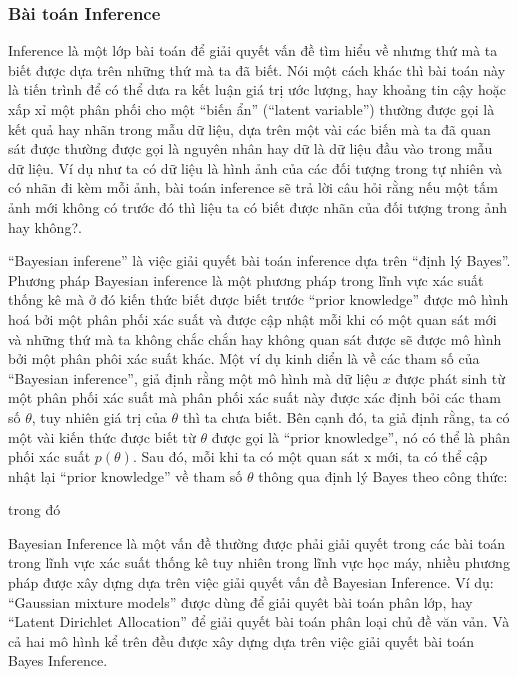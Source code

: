         \subsubsection{Bài toán Inference}
        Inference là một lớp bài toán để giải quyết vấn đề tìm hiểu về nhưng thứ mà ta biết được dựa trên những thứ mà ta đã biết. 
        Nói một cách khác thì bài toán này là tiến trình để có thể dưa ra kết luận giá trị ước lượng, hay khoảng tin cậy hoặc xấp xỉ một phân phối cho một ``biến ẩn'' (``latent variable'') thường được gọi là kết quả hay nhãn trong mẫu dữ liệu, dựa trên một vài các biến mà ta đã quan sát được thường được gọi là nguyên nhân hay dữ là dữ liệu đầu vào trong mẫu dữ liệu. 
        Ví dụ như ta có dữ liệu là hình ảnh của các đối tượng trong tự nhiên và có nhãn đi kèm mỗi ảnh, bài toán inference sẽ trả lời câu hỏi rằng nếu một tấm ảnh mới không có trước đó thì liệu ta có biết được nhãn của đối tượng trong ảnh hay không?. 

        ``Bayesian inferene'' là việc giải quyết bài toán inference dựa trên ``định lý Bayes''. Phương pháp Bayesian inference là một phương pháp trong lĩnh vực xác suất thống kê mà ở đó kiến thức biết được biết trước ``prior knowledge'' được mô hình hoá bởi một phân phối xác suất và được cập nhật mỗi khi có một quan sát mới và những thứ mà ta không chắc chắn hay không quan sát được sẽ được mô hình bởi một phân phôi xác suất khác. Một ví dụ kinh diển là về các tham số của ``Bayesian inference'', giả định rằng một mô hình mà dữ liệu $x$ được phát sinh từ một phân phối xác suất mà phân phối xác suất này được xác định bỏi các tham số $\theta$, tuy nhiên giá trị của $\theta$ thì ta chưa biết. Bên cạnh đó, ta giả định rằng, ta có một vài kiến thức được biết từ $\theta$ được gọi là ``prior knowledge'', nó có thể là phân phối xác suất $p(\theta)$. Sau đó, mỗi khi ta có một quan sát x mới, ta có thể cập nhật lại ``prior knowledge'' về tham số $\theta$ thông qua định lý Bayes theo công thức:

        trong đó 

        
        Bayesian Inference là một vấn đề thường được phải giải quyết trong các bài toán trong lĩnh vực xác suất thống kê tuy nhiên trong lĩnh vực học máy, nhiều phương pháp được xây dựng dựa trên việc giải quyết vấn đề Bayesian Inference. Ví dụ: ``Gaussian mixture models'' được dùng để giải quyêt bài toán phân lớp, hay ``Latent Dirichlet Allocation'' để giải quyết bài toán phân loại chủ đề văn vản. Và cả hai mô hình kể trên đều được xây dựng dựa trên việc giải quyết bài toán Bayes Inference.  


